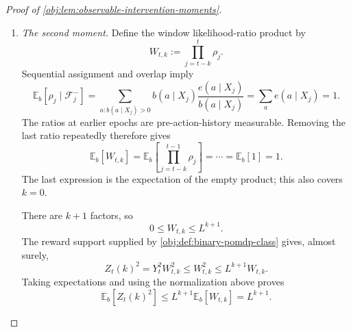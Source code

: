 \begin{proof}[Proof of \cref{obj:lem:observable-intervention-moments}]
\begin{enumerate}
In the zero-based convention, \cref{obj:ass:stationary-start} gives
\[
\mathbb E_b[f(S_0)]
=
\sum_{s\in\mathcal S}d_b(s)f(s),
\qquad d_bP_b=d_b.
\]
The unweighted one-step identity propagates this equality. Indeed, if it holds at epoch \(j\), then
\[
\begin{aligned}
\mathbb E_b[f(S_{j+1})]
&=\mathbb E_b[(P_bf)(S_j)]\\
&=\sum_s d_b(s)\sum_{s'}P_b(s,s')f(s')\\
&=\sum_{s'}(d_bP_b)(s')f(s')
=\sum_{s'}d_b(s')f(s').
\end{aligned}
\]
Thus, by induction,
\[
\mathbb E_b[f(S_j)]=\sum_s d_b(s)f(s),
\qquad 0\le j<T.
\]

Finally, the backward recursion agrees with matrix powers:
\[
f_{e,0}=P_e^0r_e,\qquad
f_{e,\ell+1}
=P_ef_{e,\ell}
=P_e(P_e^\ell r_e)
=P_e^{\ell+1}r_e.
\]
Consequently,
\[
\begin{aligned}
\mathbb E_b[Z_t(k)]
&=\sum_s d_b(s)(P_e^kr_e)(s)\\
&=\sum_{s'}\left(\sum_s d_b(s)P_e^k(s,s')\right)r_e(s')\\
&=\sum_{s'}(d_bP_e^k)(s')r_e(s')
=d_bP_e^kr_e.
\end{aligned}
\]
This expression is independent of \(t\), so it gives the stated common moment \(m_k\).

\item \emph{The second moment.}
Define the window likelihood-ratio product by
\[
W_{t,k}:=\prod_{j=t-k}^{t}\rho_j.
\]
Sequential assignment and overlap imply
\[
\mathbb E_b[\rho_j\mid\mathcal F_j^-]
=
\sum_{a:b(a\mid X_j)>0}
b(a\mid X_j)\frac{e(a\mid X_j)}{b(a\mid X_j)}
=
\sum_a e(a\mid X_j)
=1.
\]
The ratios at earlier epochs are pre-action-history measurable. Removing the last ratio repeatedly therefore gives
\[
\mathbb E_b[W_{t,k}]
=
\mathbb E_b\!\left[\prod_{j=t-k}^{t-1}\rho_j\right]
=\cdots=
\mathbb E_b[1]
=1.
\]
The last expression is the expectation of the empty product; this also covers \(k=0\).

There are \(k+1\) factors, so
\[
0\le W_{t,k}\le L^{k+1}.
\]
The reward support supplied by \cref{obj:def:binary-pomdp-class} gives, almost surely,
\[
Z_t(k)^2
=Y_t^2W_{t,k}^2
\le W_{t,k}^2
\le L^{k+1}W_{t,k}.
\]
Taking expectations and using the normalization above proves
\[
\mathbb E_b[Z_t(k)^2]
\le L^{k+1}\mathbb E_b[W_{t,k}]
=L^{k+1}.
\]


\end{enumerate}
\end{proof}
